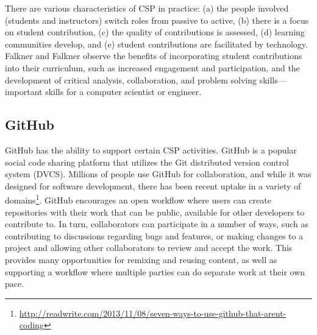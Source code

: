 There are various characteristics of CSP in practice: (a) the people involved (students and instructors) switch roles from passive to active, (b) there is a focus on student contribution, (c) the quality of contributions is assessed, (d) learning communities develop, and (e) student contributions are facilitated by technology. Falkner and Falkner \cite{falkner2012supporting} observe the benefits of incorporating student contributions into their curriculum, such as increased engagement and participation, and the development of critical analysis, collaboration, and problem solving skills---important skills for a computer scientist or engineer.

\subsection{GitHub}
GitHub has the ability to support certain CSP activities. GitHub is a popular social code sharing platform that utilizes the Git distributed version control system (DVCS). Millions of people use GitHub for collaboration, and while it was designed for software development, there has been recent uptake in a variety of domains\footnote{\url{http://readwrite.com/2013/11/08/seven-ways-to-use-github-that-arent-coding}}. GitHub encourages an open workflow where users can create repositories with their work that can be public, available for other developers to contribute to. In turn, collaborators can participate in a number of ways, such as contributing to discussions regarding bugs and features, or making changes to a project and allowing other collaborators to review and accept the work. This provides many opportunities for remixing and reusing content, as well as supporting a workflow where multiple parties can do separate work at their own pace.

